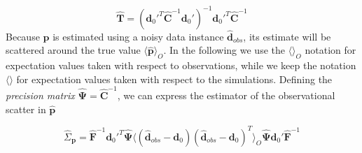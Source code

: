 \documentclass[reprint,aps,prd,superscriptaddress,showkeys,showpacs]{revtex4-1}
\newcommand{\bb}[1]{\mathbf{#1}}
\newcommand{\bbh}[1]{\mathbf{\hat{#1}}}
\newcommand{\h}[1]{\hat{#1}}
\begin{document}
\begin{equation}
\bbh{T} = (\bb{d}_0'^T\bbh{C}^{-1}\bb{d}_0')^{-1}\bb{d}_0'^T\bbh{C}^{-1}
\end{equation}
%
Because $\bbh{p}$ is estimated using a noisy data instance $\bbh{d}_{obs}$, its estimate will be scattered around the true value $\langle\bbh{p}\rangle_O$. In the following we use the $\langle\rangle_O$ notation for expectation values taken with respect to observations, while we keep the notation $\langle\rangle$ for expectation values taken with respect to the simulations. Defining the \textit{precision matrix} $\bbh{\Psi}=\bbh{C}^{-1}$, we can express the estimator of the observational scatter in $\bbh{p}$

\begin{equation}
\label{estimatorcovariance}
\h{\Sigma}_\bb{p} = \bbh{F}^{-1}\bb{d}_0'^T\bbh{\Psi}\langle(\bbh{d}_{obs}-\bb{d}_0)(\bbh{d}_{obs}-\bb{d}_0)^T\rangle_O\bbh{\Psi}\bb{d}_0'\bbh{F}^{-1}
\end{equation}
\end{document}
